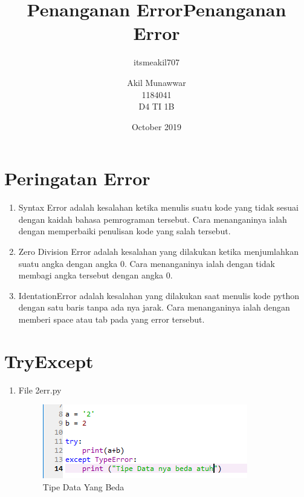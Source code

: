 \documentclass{article}
\title{Penanganan Error}
\author{itsmeakil707 }
\date{October 2019}
\begin{document}
\title{Penanganan Error}
\author{Akil Munawwar \\ 1184041 \\ D4 TI 1B}
\maketitle

\section{Peringatan Error}
    \begin{enumerate}
        \item Syntax Error adalah kesalahan ketika menulis suatu kode yang tidak sesuai dengan kaidah bahasa pemrograman tersebut. Cara menanganinya ialah dengan memperbaiki penulisan kode yang salah tersebut.
        \item Zero Division Error adalah kesalahan yang dilakukan ketika menjumlahkan suatu angka dengan angka 0. Cara menanganinya ialah dengan tidak membagi angka tersebut dengan angka 0.
        \item IdentationError adalah kesalahan yang dilakukan saat menulis kode python dengan satu baris tanpa ada nya jarak. Cara menanganinya ialah dengan memberi space atau tab pada yang error tersebut.
    \end{enumerate}
\section{TryExcept}
    \begin{enumerate}
        \item File 2err.py
        \begin{figure}[!htbp]
            \centering
            \includegraphics{TipeDataError.PNG}
            \caption{Tipe Data Yang Beda}
        \end{figure}
    \end{enumerate}
\end{document}
